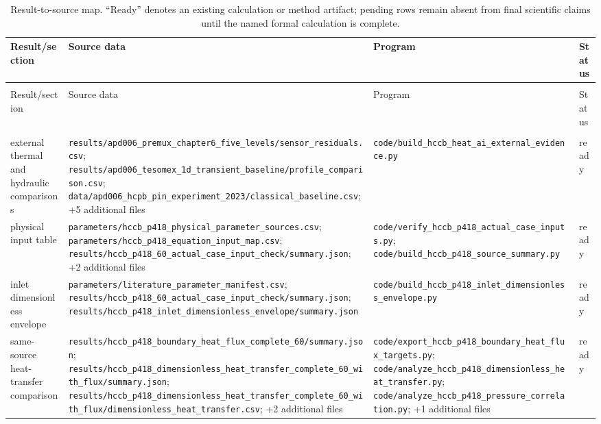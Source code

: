 \begingroup
\scriptsize
\setlength{\tabcolsep}{3pt}
\begin{longtable}{>{\raggedright\arraybackslash}p{2.8cm}>{\raggedright\arraybackslash}p{6.6cm}>{\raggedright\arraybackslash}p{6.4cm}>{\raggedright\arraybackslash}p{2.4cm}}
\caption{Result-to-source map. ``Ready'' denotes an existing calculation or method artifact; pending rows remain absent from final scientific claims until the named formal calculation is complete.}\label{tab:supp_result_source_map}\\
\toprule
Result/section & Source data & Program & Status \\
\midrule
\endfirsthead
\multicolumn{4}{l}{\textit{Table \thetable\ continued}}\\
\toprule
Result/section & Source data & Program & Status \\
\midrule
\endhead
\midrule
\multicolumn{4}{r}{\textit{Continued on next page}}\\
\endfoot
\bottomrule
\endlastfoot
external thermal and hydraulic comparisons & \nolinkurl{results/apd006_premux_chapter6_five_levels/sensor_residuals.csv}; \nolinkurl{results/apd006_tesomex_1d_transient_baseline/profile_comparison.csv}; \nolinkurl{data/apd006_hcpb_pin_experiment_2023/classical_baseline.csv}; +5 additional files & \nolinkurl{code/build_hccb_heat_ai_external_evidence.py} & ready \\
physical input table & \nolinkurl{parameters/hccb_p418_physical_parameter_sources.csv}; \nolinkurl{parameters/hccb_p418_equation_input_map.csv}; \nolinkurl{results/hccb_p418_60_actual_case_input_check/summary.json}; +2 additional files & \nolinkurl{code/verify_hccb_p418_actual_case_inputs.py}; \nolinkurl{code/build_hccb_p418_source_summary.py} & ready \\
inlet dimensionless envelope & \nolinkurl{parameters/literature_parameter_manifest.csv}; \nolinkurl{results/hccb_p418_60_actual_case_input_check/summary.json}; \nolinkurl{results/hccb_p418_inlet_dimensionless_envelope/summary.json} & \nolinkurl{code/build_hccb_p418_inlet_dimensionless_envelope.py} & ready \\
same-source heat-transfer comparison & \nolinkurl{results/hccb_p418_boundary_heat_flux_complete_60/summary.json}; \nolinkurl{results/hccb_p418_dimensionless_heat_transfer_complete_60_with_flux/summary.json}; \nolinkurl{results/hccb_p418_dimensionless_heat_transfer_complete_60_with_flux/dimensionless_heat_transfer.csv}; +2 additional files & \nolinkurl{code/export_hccb_p418_boundary_heat_flux_targets.py}; \nolinkurl{code/analyze_hccb_p418_dimensionless_heat_transfer.py}; \nolinkurl{code/analyze_hccb_p418_pressure_correlation.py}; +1 additional files & ready \\

\end{longtable}
